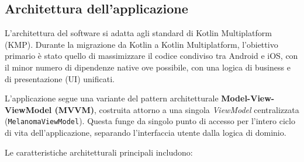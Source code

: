 \subsection{Architettura dell'applicazione}\label{subsec:architettura-dell'applicazione}
L'architettura del software si adatta agli standard di Kotlin Multiplatform (KMP). Durante la migrazione da Kotlin a Kotlin Multiplatform, l'obiettivo primario
è stato quello di massimizzare il codice condiviso tra Android e iOS, con il minor numero di dipendenze native ove possibile, con una logica di business e di presentazione (UI) unificati.

L'applicazione segue una variante del pattern architetturale \textbf{Model-View-ViewModel (MVVM)}, costruita attorno a una singola \textit{ViewModel} centralizzata (\texttt{MelanomaViewModel}).
Questa funge da singolo punto di accesso per l'intero ciclo di vita dell'applicazione, separando l'interfaccia utente dalla logica di dominio.

Le caratteristiche architetturali principali includono:

